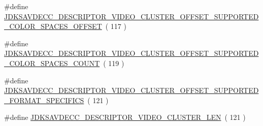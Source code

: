 \begin{DoxyCompactItemize}
\item 
\#define \hyperlink{group__descriptor__video__cluster_gaf44e747088dab64567cea18584e6e45b}{J\+D\+K\+S\+A\+V\+D\+E\+C\+C\+\_\+\+D\+E\+S\+C\+R\+I\+P\+T\+O\+R\+\_\+\+V\+I\+D\+E\+O\+\_\+\+C\+L\+U\+S\+T\+E\+R\+\_\+\+O\+F\+F\+S\+E\+T\+\_\+\+S\+U\+P\+P\+O\+R\+T\+E\+D\+\_\+\+C\+O\+L\+O\+R\+\_\+\+S\+P\+A\+C\+E\+S\+\_\+\+O\+F\+F\+S\+ET}~( 117 )
\item 
\#define \hyperlink{group__descriptor__video__cluster_gacd67261cce74dfcfbc6875f16eaffa1c}{J\+D\+K\+S\+A\+V\+D\+E\+C\+C\+\_\+\+D\+E\+S\+C\+R\+I\+P\+T\+O\+R\+\_\+\+V\+I\+D\+E\+O\+\_\+\+C\+L\+U\+S\+T\+E\+R\+\_\+\+O\+F\+F\+S\+E\+T\+\_\+\+S\+U\+P\+P\+O\+R\+T\+E\+D\+\_\+\+C\+O\+L\+O\+R\+\_\+\+S\+P\+A\+C\+E\+S\+\_\+\+C\+O\+U\+NT}~( 119 )
\item 
\#define \hyperlink{group__descriptor__video__cluster_ga1ad5498414c6cfabdf306bfdd85cc47d}{J\+D\+K\+S\+A\+V\+D\+E\+C\+C\+\_\+\+D\+E\+S\+C\+R\+I\+P\+T\+O\+R\+\_\+\+V\+I\+D\+E\+O\+\_\+\+C\+L\+U\+S\+T\+E\+R\+\_\+\+O\+F\+F\+S\+E\+T\+\_\+\+S\+U\+P\+P\+O\+R\+T\+E\+D\+\_\+\+F\+O\+R\+M\+A\+T\+\_\+\+S\+P\+E\+C\+I\+F\+I\+CS}~( 121 )
\item 
\#define \hyperlink{group__descriptor__video__cluster_gad9866f1282631e70b01a84c6a9bf5187}{J\+D\+K\+S\+A\+V\+D\+E\+C\+C\+\_\+\+D\+E\+S\+C\+R\+I\+P\+T\+O\+R\+\_\+\+V\+I\+D\+E\+O\+\_\+\+C\+L\+U\+S\+T\+E\+R\+\_\+\+L\+EN}~( 121 )
\end{DoxyCompactItemize}

